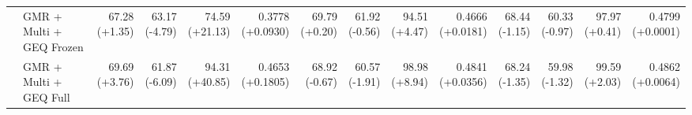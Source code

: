 \documentclass{article}
\begin{document}
{\begin{tabular}{llrrrrrrrrrrrr}
 & GMR + Multi + GEQ Frozen & \shortstack{67.28 \\ {\scriptsize\textcolor{Gain}{(+1.35)}}} & \shortstack{63.17 \\ {\scriptsize\textcolor{Loss}{(-4.79)}}} & \shortstack{74.59 \\ {\scriptsize\textcolor{Gain}{(+21.13)}}} & \shortstack{0.3778 \\ {\scriptsize\textcolor{Gain}{(+0.0930)}}} & \shortstack{69.79 \\ {\scriptsize\textcolor{Gain}{(+0.20)}}} & \shortstack{61.92 \\ {\scriptsize\textcolor{Loss}{(-0.56)}}} & \shortstack{94.51 \\ {\scriptsize\textcolor{Gain}{(+4.47)}}} & \shortstack{0.4666 \\ {\scriptsize\textcolor{Gain}{(+0.0181)}}} & \shortstack{68.44 \\ {\scriptsize\textcolor{Loss}{(-1.15)}}} & \shortstack{60.33 \\ {\scriptsize\textcolor{Loss}{(-0.97)}}} & \shortstack{97.97 \\ {\scriptsize\textcolor{Gain}{(+0.41)}}} & \shortstack{0.4799 \\ {\scriptsize\textcolor{Gain}{(+0.0001)}}} \\
 & GMR + Multi + GEQ Full & \shortstack{69.69 \\ {\scriptsize\textcolor{Gain}{(+3.76)}}} & \shortstack{61.87 \\ {\scriptsize\textcolor{Loss}{(-6.09)}}} & \shortstack{94.31 \\ {\scriptsize\textcolor{Gain}{(+40.85)}}} & \shortstack{0.4653 \\ {\scriptsize\textcolor{Gain}{(+0.1805)}}} & \shortstack{68.92 \\ {\scriptsize\textcolor{Loss}{(-0.67)}}} & \shortstack{60.57 \\ {\scriptsize\textcolor{Loss}{(-1.91)}}} & \shortstack{98.98 \\ {\scriptsize\textcolor{Gain}{(+8.94)}}} & \shortstack{0.4841 \\ {\scriptsize\textcolor{Gain}{(+0.0356)}}} & \shortstack{68.24 \\ {\scriptsize\textcolor{Loss}{(-1.35)}}} & \shortstack{59.98 \\ {\scriptsize\textcolor{Loss}{(-1.32)}}} & \shortstack{99.59 \\ {\scriptsize\textcolor{Gain}{(+2.03)}}} & \shortstack{0.4862 \\ {\scriptsize\textcolor{Gain}{(+0.0064)}}} \\

\end{tabular}}
\end{document}
